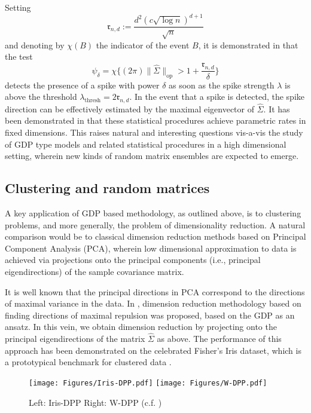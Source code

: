 Setting \[\mathfrak{r}_{n,d}:=\frac{d^2(c \sqrt{\log n})^{d+1}}{\sqrt{n}}\] and denoting by $\chi(B)$ the indicator of the event $B$, it is demonstrated in \cite{GDP} that the test  
\[\psi_\delta=\chi\big\{ (2\pi)\|\hat \Sigma\|_{\mathrm{op}}>1+ \frac{\mathfrak{r}_{n,d}}{\delta}\big\}\]  
detects the presence of a spike with power $\delta$ as soon as the spike strength $\lambda$ is above the threshold $\lambda_{\mathrm{thresh}}=2\mathfrak{r}_{n,d}$. In the event that a spike is detected, the spike direction can be effectively estimated by the maximal eigenvector of $\hat \Sigma$. It has been demonstrated in \cite{GDP} that these statistical procedures achieve parametric rates in fixed dimensions. This raises natural and interesting questions vis-a-vis the study of GDP type models and related statistical procedures in a high dimensional setting, wherein new kinds of random matrix ensembles are expected to emerge.

\subsection{Clustering and random matrices}
A key application of GDP based methodology, as outlined above, is to clustering problems, and more generally, the problem of dimensionality reduction. A natural comparison would be to classical dimension reduction methods based on Principal Component Analysis (PCA), wherein low dimensional approximation to data is achieved via projections onto the principal components (i.e., principal eigendirections) of the sample covariance matrix. 

It is well known that the principal directions in PCA correspond to the directions of maximal variance in the data. In \cite{GDP}, dimension reduction methodology based on finding directions of maximal repulsion was proposed, based on the GDP as an ansatz. In this vein, we obtain dimension reduction by projecting onto the principal eigendirections of the matrix $\hat \Sigma$ as above. The performance of this approach has been demonstrated on the celebrated Fisher's Iris dataset, which is a prototypical benchmark for clustered data \cite{GDP}. 

\begin{figure}[h]
    \centering
    \texttt{[image: Figures/Iris-DPP.pdf]}
    \texttt{[image: Figures/W-DPP.pdf]}
    \caption{Left: Iris-DPP \qquad \qquad Right: W-DPP \qquad (c.f. \cite{GDP})}
    \label{fig:iris}
\end{figure}


